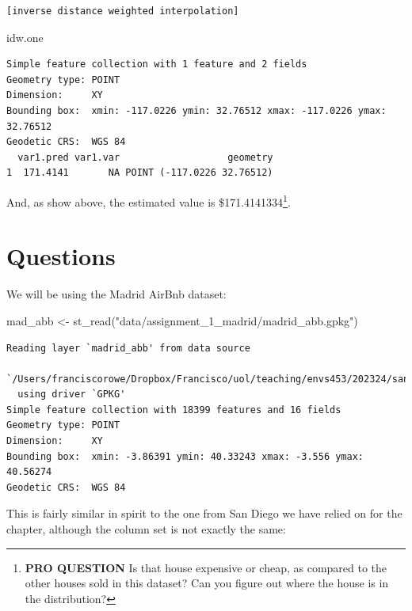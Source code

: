 \documentclass[
  letterpaper,
  DIV=11,
  numbers=noendperiod,
  oneside]{scrreprt}
\newenvironment{Shaded}{\begin{snugshade}}{\end{snugshade}}
\newcommand{\FunctionTok}[1]{\textcolor[rgb]{0.28,0.35,0.67}{#1}}
\newcommand{\NormalTok}[1]{\textcolor[rgb]{0.00,0.23,0.31}{#1}}
\newcommand{\OtherTok}[1]{\textcolor[rgb]{0.00,0.23,0.31}{#1}}
\newcommand{\StringTok}[1]{\textcolor[rgb]{0.13,0.47,0.30}{#1}}
\begin{document}
\begin{verbatim}
[inverse distance weighted interpolation]
\end{verbatim}

\begin{Shaded}
\begin{Highlighting}[]
\NormalTok{idw.one}
\end{Highlighting}
\end{Shaded}

\begin{verbatim}
Simple feature collection with 1 feature and 2 fields
Geometry type: POINT
Dimension:     XY
Bounding box:  xmin: -117.0226 ymin: 32.76512 xmax: -117.0226 ymax: 32.76512
Geodetic CRS:  WGS 84
  var1.pred var1.var                   geometry
1  171.4141       NA POINT (-117.0226 32.76512)
\end{verbatim}

And, as show above, the estimated value is \$171.4141334\footnote{\textbf{PRO
  QUESTION} Is that house expensive or cheap, as compared to the other
  houses sold in this dataset? Can you figure out where the house is in
  the distribution?}.

\section{Questions}\label{questions}

We will be using the Madrid AirBnb dataset:

\begin{Shaded}
\begin{Highlighting}[]
\NormalTok{mad\_abb }\OtherTok{\textless{}{-}} \FunctionTok{st\_read}\NormalTok{(}\StringTok{"data/assignment\_1\_madrid/madrid\_abb.gpkg"}\NormalTok{)}
\end{Highlighting}
\end{Shaded}

\begin{verbatim}
Reading layer `madrid_abb' from data source 
  `/Users/franciscorowe/Dropbox/Francisco/uol/teaching/envs453/202324/san/data/assignment_1_madrid/madrid_abb.gpkg' 
  using driver `GPKG'
Simple feature collection with 18399 features and 16 fields
Geometry type: POINT
Dimension:     XY
Bounding box:  xmin: -3.86391 ymin: 40.33243 xmax: -3.556 ymax: 40.56274
Geodetic CRS:  WGS 84
\end{verbatim}

This is fairly similar in spirit to the one from San Diego we have
relied on for the chapter, although the column set is not exactly the
same:
\end{document}

